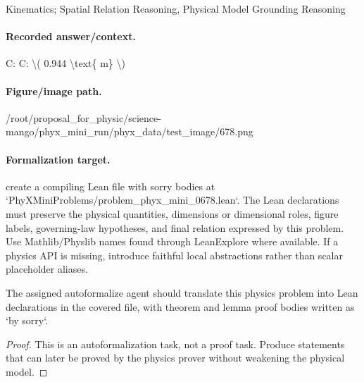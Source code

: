 Kinematics; Spatial Relation Reasoning, Physical Model Grounding Reasoning

\paragraph{Recorded answer/context.}
C: C: \textbackslash{}( 0.944 \textbackslash{}text\{ m\} \textbackslash{})

\paragraph{Figure/image path.}
/root/proposal\_for\_physic/science-mango/phyx\_mini\_run/phyx\_data/test\_image/678.png

\paragraph{Formalization target.}
create a compiling Lean file with sorry bodies at `PhyXMiniProblems/problem\_phyx\_mini\_0678.lean`. The Lean declarations must preserve the physical quantities, dimensions or dimensional roles, figure labels, governing-law hypotheses, and final relation expressed by this problem.
Use Mathlib/Physlib names found through LeanExplore where available. If a physics API is missing, introduce faithful local abstractions rather than scalar placeholder aliases.

\begin{theorem}
\label{thm:physics:phyx_mini_0678:target}
The assigned autoformalize agent should translate this physics problem into Lean declarations in the covered file, with theorem and lemma proof bodies written as `by sorry`.
\end{theorem}
\begin{proof}
This is an autoformalization task, not a proof task. Produce statements that can later be proved by the physics prover without weakening the physical model.
\end{proof}

